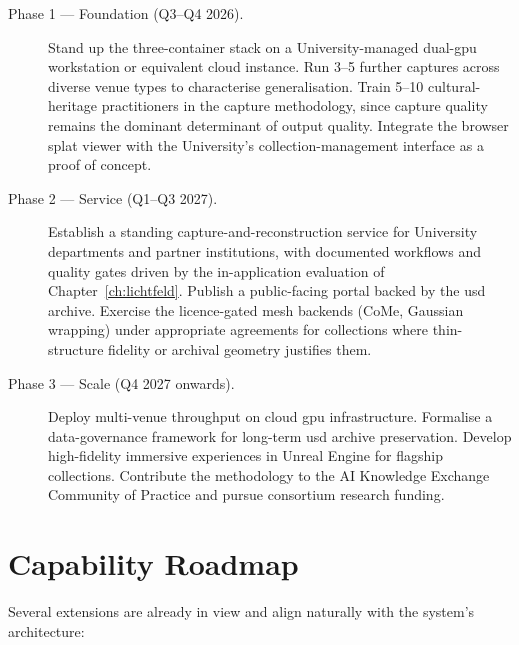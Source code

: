 \begin{description}
  \item[Phase 1 --- Foundation (Q3--Q4 2026).] Stand up the three-container stack on a University-managed dual-\acrshort{gpu} workstation or equivalent cloud instance. Run 3--5 further captures across diverse venue types to characterise generalisation. Train 5--10 cultural-heritage practitioners in the capture methodology, since capture quality remains the dominant determinant of output quality. Integrate the browser splat viewer with the University's collection-management interface as a proof of concept.

  \item[Phase 2 --- Service (Q1--Q3 2027).] Establish a standing capture-and-reconstruction service for University departments and partner institutions, with documented workflows and quality gates driven by the in-application evaluation of Chapter~\ref{ch:lichtfeld}. Publish a public-facing portal backed by the \acrshort{usd} archive. Exercise the licence-gated mesh backends (CoMe, Gaussian wrapping) under appropriate agreements for collections where thin-structure fidelity or archival geometry justifies them.

  \item[Phase 3 --- Scale (Q4 2027 onwards).] Deploy multi-venue throughput on cloud \acrshort{gpu} infrastructure. Formalise a data-governance framework for long-term \acrshort{usd} archive preservation. Develop high-fidelity immersive experiences in Unreal Engine for flagship collections. Contribute the methodology to the AI Knowledge Exchange Community of Practice and pursue consortium research funding.
\end{description}

\section{Capability Roadmap}
\label{sec:road-capability}

Several extensions are already in view and align naturally with the system's architecture:

